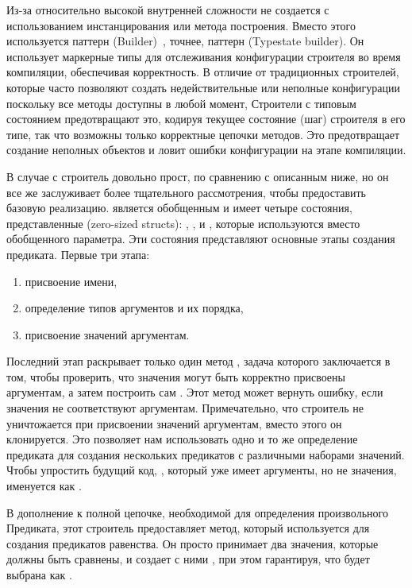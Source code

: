 Из-за относительно высокой внутренней сложности
 не создается с использованием
инстанцирования или метода построения.
Вместо этого используется паттерн
 (Builder)~\cite{enwiki:builder},
точнее, паттерн  (Typestate builder).
Он использует маркерные типы для отслеживания конфигурации строителя во время компиляции,
обеспечивая корректность.
В отличие от традиционных строителей,
которые часто позволяют создать недействительные или неполные конфигурации
поскольку все методы доступны в любой момент,
Строители с типовым состоянием предотвращают это, кодируя
текущее состояние (шаг) строителя в его типе,
так что возможны только корректные цепочки методов.
Это предотвращает создание неполных объектов
и ловит ошибки конфигурации на этапе компиляции.

В случае с  строитель довольно прост,
по сравнению с описанным ниже,
но он все же заслуживает более тщательного рассмотрения, чтобы предоставить базовую реализацию.
 является обобщенным и имеет четыре состояния,
представленные  (zero-sized structs):
, ,  и ,
которые используются вместо обобщенного параметра.
Эти состояния представляют основные этапы создания предиката.
Первые три этапа:
\begin{enumerate}
  \item присвоение имени,
  \item определение типов аргументов и их порядка,
  \item присвоение значений аргументам.
\end{enumerate}

Последний этап раскрывает только один метод ,
задача которого заключается в том, чтобы проверить, что значения
могут быть корректно присвоены аргументам, а затем построить сам .
Этот метод может вернуть ошибку, если значения не соответствуют аргументам.
Примечательно, что строитель не уничтожается при присвоении значений аргументам,
вместо этого он клонируется. Это позволяет нам использовать одно и то же определение предиката
для создания нескольких предикатов с различными наборами значений.
Чтобы упростить будущий код, , который уже имеет
аргументы, но не значения, именуется как .

В дополнение к полной цепочке, необходимой для определения произвольного Предиката,
этот строитель предоставляет метод, который используется для создания предикатов равенства.
Он просто принимает два значения, которые должны быть сравнены,
и создает с ними , при этом гарантируя, что
 будет выбрана как .

